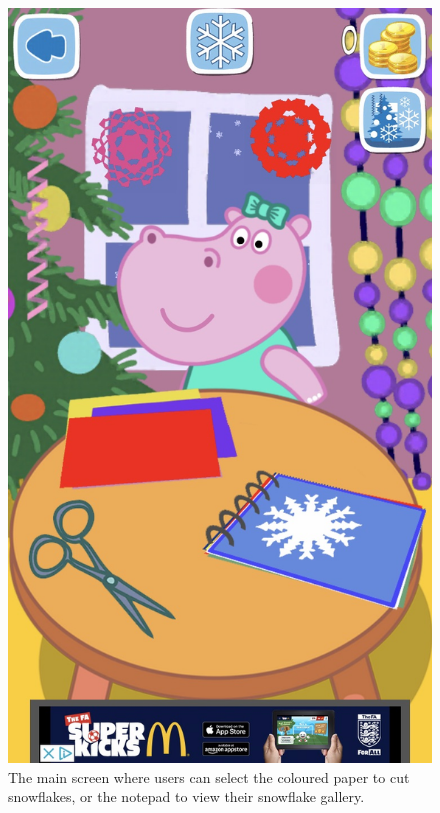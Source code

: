 \documentclass[11pt]{article}
\begin{document}
\begin{figure}[!ht]
\begin{minipage}{0.32\textwidth}
                            \includegraphics[width=0.8\linewidth]{Images/peppa/peppaMain}
                             \caption{The main screen where users can select the coloured paper to cut snowflakes, or the notepad to view their snowflake gallery.\\}
                            \label{fig:peppaMain}
                        \end{minipage}
                        \begin{minipage}{0.32\textwidth}
                            \centering

\end{minipage}
\end{figure}
\end{document}

